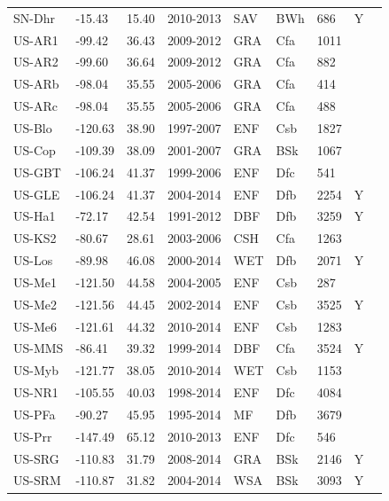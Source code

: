 \documentclass{myreport}
\begin{document}
\begin{longtable}{lllllllll}
  SN-Dhr & -15.43 & 15.40 & 2010-2013 & SAV & BWh & 686 & Y & \citet{SN-Dhr} \\ 
  US-AR1 & -99.42 & 36.43 & 2009-2012 & GRA & Cfa & 1011 &  & \citet{US-AR1} \\ 
  US-AR2 & -99.60 & 36.64 & 2009-2012 & GRA & Cfa & 882 &  & \citet{US-AR2} \\ 
  US-ARb & -98.04 & 35.55 & 2005-2006 & GRA & Cfa & 414 &  & \citet{US-ARb} \\ 
  US-ARc & -98.04 & 35.55 & 2005-2006 & GRA & Cfa & 488 &  & \citet{US-ARc} \\ 
  US-Blo & -120.63 & 38.90 & 1997-2007 & ENF & Csb & 1827 &  & \citet{US-Blo} \\ 
  US-Cop & -109.39 & 38.09 & 2001-2007 & GRA & BSk & 1067 &  & \citet{US-Cop} \\ 
  US-GBT & -106.24 & 41.37 & 1999-2006 & ENF & Dfc & 541 &  & \citet{US-GBT} \\ 
  US-GLE & -106.24 & 41.37 & 2004-2014 & ENF & Dfb & 2254 & Y & \citet{US-GLE} \\ 
  US-Ha1 & -72.17 & 42.54 & 1991-2012 & DBF & Dfb & 3259 & Y & \citet{US-Ha1} \\ 
  US-KS2 & -80.67 & 28.61 & 2003-2006 & CSH & Cfa & 1263 &  & \citet{US-KS2} \\ 
  US-Los & -89.98 & 46.08 & 2000-2014 & WET & Dfb & 2071 & Y & \citet{US-Los} \\ 
  US-Me1 & -121.50 & 44.58 & 2004-2005 & ENF & Csb & 287 &  & \citet{US-Me1} \\ 
  US-Me2 & -121.56 & 44.45 & 2002-2014 & ENF & Csb & 3525 & Y & \citet{US-Me2} \\ 
  US-Me6 & -121.61 & 44.32 & 2010-2014 & ENF & Csb & 1283 &  & \citet{US-Me6} \\ 
  US-MMS & -86.41 & 39.32 & 1999-2014 & DBF & Cfa & 3524 & Y & \citet{US-MMS} \\ 
  US-Myb & -121.77 & 38.05 & 2010-2014 & WET & Csb & 1153 &  & \citet{US-Myb} \\ 
  US-NR1 & -105.55 & 40.03 & 1998-2014 & ENF & Dfc & 4084 &  & \citet{US-NR1} \\ 
  US-PFa & -90.27 & 45.95 & 1995-2014 & MF & Dfb & 3679 &  & \citet{US-PFa} \\ 
  US-Prr & -147.49 & 65.12 & 2010-2013 & ENF & Dfc & 546 &  & \citet{US-Prr} \\ 
  US-SRG & -110.83 & 31.79 & 2008-2014 & GRA & BSk & 2146 & Y & \citet{US-SRG} \\ 
  US-SRM & -110.87 & 31.82 & 2004-2014 & WSA & BSk & 3093 & Y & \citet{US-SRM} \\ 

\end{longtable}
\end{document}

